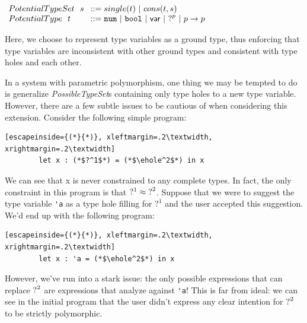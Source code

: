 \begin{center}
$\arraycolsep=4pt\begin{array}{lll}
PotentialTypeSet~~ s & ::=
single(t) ~\vert~
cons(t, s)
\\
PotentialType~~ t & ::= 
  \tnum ~\vert~
  \tbool ~\vert~
  \TVar ~\vert~
  \tehole^p ~\vert~
  \tarr{p}{p}
  \\
\end{array}$
\end{center}

Here, we choose to represent type variables as a ground type, thus enforcing that type variables are inconsistent with other ground types and consistent with type holes and each other. 

In a system with parametric polymorphism, one thing we may be tempted to do is generalize \emph{PossibleTypeSet}s containing only type holes to a new type variable. However, there are a few subtle issues to be cautious of when considering this extension. Consider the following simple program:

\begin{center}
    \begin{lstlisting}[escapeinside={(*}{*)}, xleftmargin=.2\textwidth, xrightmargin=.2\textwidth]
        let x : (*$?^1$*) = (*$\ehole^2$*) in x
    \end{lstlisting}
\end{center}

We can see that x is never constrained to any complete types. In fact, the only constraint in this program is that $?^1 \approx \mathtt{?}^2$. Suppose that we were to suggest the type variable \lstinline{'a} as a type hole filling for $?^1$ and the user accepted this suggestion. We'd end up with the following program:

\begin{center}
    \begin{lstlisting}[escapeinside={(*}{*)}, xleftmargin=.2\textwidth, xrightmargin=.2\textwidth]
        let x : 'a = (*$\ehole^2$*) in x
    \end{lstlisting}
\end{center}

However, we've run into a stark issue: the only possible expressions that can replace $\mathtt{?}^2$ are expressions that analyze against \lstinline{'a}! This is far from ideal: we can see in the initial program that the user didn't express any clear intention for $\mathtt{?}^2$ to be strictly polymorphic.

